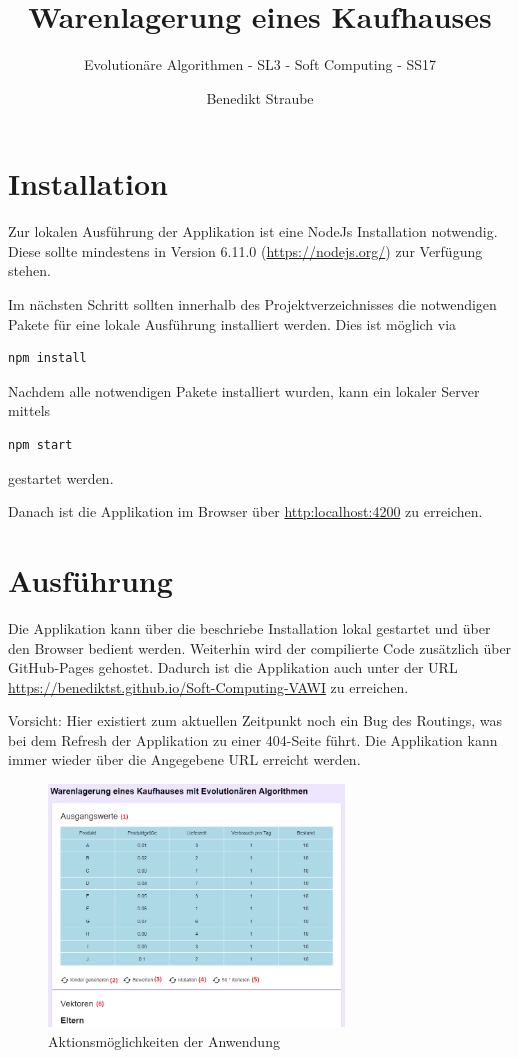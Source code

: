 \documentclass[]{scrartcl}
\title{Warenlagerung eines Kaufhauses}
\subtitle{Evolutionäre Algorithmen - SL3 - Soft Computing - SS17}
\author{Benedikt Straube}
\begin{document}
\maketitle

\newpage

\section{Installation}
Zur lokalen Ausführung der Applikation ist eine NodeJs Installation notwendig. Diese sollte mindestens in Version 6.11.0 (\url{https://nodejs.org/}) zur Verfügung stehen.

Im nächsten Schritt sollten innerhalb des Projektverzeichnisses die notwendigen Pakete für eine lokale Ausführung installiert werden. Dies ist möglich via 
\begin{lstlisting}[backgroundcolor=\color{lightgray}]
npm install
\end{lstlisting}

Nachdem alle notwendigen Pakete installiert wurden, kann ein lokaler Server mittels
\begin{lstlisting}[backgroundcolor=\color{lightgray}]
npm start
\end{lstlisting}
gestartet werden.

Danach ist die Applikation im Browser über \url{http:localhost:4200} zu erreichen.


\section{Ausführung}
\label{ausfuehrung}
Die Applikation kann über die beschriebe Installation lokal gestartet und über den Browser bedient werden. Weiterhin wird der compilierte Code zusätzlich über GitHub-Pages gehostet. Dadurch ist die Applikation auch unter der URL \url{https://benediktst.github.io/Soft-Computing-VAWI} zu erreichen.

Vorsicht: Hier existiert zum aktuellen Zeitpunkt noch ein Bug des Routings, was bei dem Refresh der Applikation zu einer 404-Seite führt. Die Applikation kann immer wieder über die Angegebene URL erreicht werden.

\begin{figure}[htbp]
	\centering
	\includegraphics[width=0.7\textwidth]{res/interface.png}
	\caption{Aktionsmöglichkeiten der Anwendung}
	\label{img:interface}
\end{figure}
\end{document}
